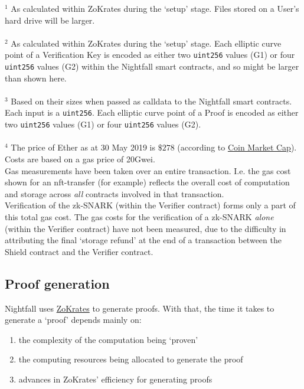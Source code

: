 $^1$ As calculated within ZoKrates during the `setup' stage. Files stored on a User's hard drive will be larger.\\
\\
$^2$ As calculated within ZoKrates during the `setup' stage. Each elliptic curve point of a Verification Key is encoded as either two \texttt{uint256} values (G1) or four \texttt{uint256} values (G2) within the Nightfall smart contracts, and so might be larger than shown here.\\
\\
$^3$ Based on their sizes when passed as calldata to the Nightfall smart contracts. Each input is a \texttt{uint256}. Each elliptic curve point of a Proof is encoded as either two \texttt{uint256} values (G1) or four \texttt{uint256} values (G2).\\
\\
$^{4}$ The price of Ether as at 30 May 2019 is $\$278$ (according to \href{https://coinmarketcap.com/}{Coin Market Cap}). Costs are based on a gas price of 20Gwei.\\
Gas measurements have been taken over an entire transaction. I.e. the gas cost shown for an nft-transfer (for example) reflects the overall cost of computation and storage across \textit{all} contracts involved in that transaction.\\
Verification of the zk-SNARK (within the Verifier contract) forms only a part of this total gas cost. The gas costs for the verification of a zk-SNARK \textit{alone} (within the Verifier contract) have not been measured, due to the difficulty in attributing the final `storage refund' at the end of a transaction between the Shield contract and the Verifier contract.


\subsection{Proof generation}

Nightfall uses \hyperref[sec:zokrates]{ZoKrates} to generate proofs. With that, the time it takes to generate a `proof' depends mainly on:
\begin{enumerate}
  \item the complexity of the computation being `proven'
  \item the computing resources being allocated to generate the proof
  \item advances in ZoKrates' efficiency for generating proofs
\end{enumerate}


